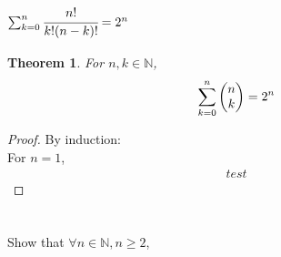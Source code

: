 \documentclass[]{article}
\newcommand{\N}{\mathbb{N}}
\newtheorem{theorem}{Theorem}
\begin{document}
\newpage
\subsubsection{$\sum_{k=0}^{n} \cfrac{n!}{k!(n-k)!} = 2^n$}
\begin{theorem}
    For $n,k \in \N$,
    $$\sum_{k=0}^{n} \mqty(n\\k) = 2^n$$
\end{theorem}
\begin{proof}
    By induction:\\
    For $n=1$,
    \begin{align*}
        test
    \end{align*}
\end{proof}












\newpage
\section{}
Show that $\forall n \in \N, n \geq 2$,

\end{document}

